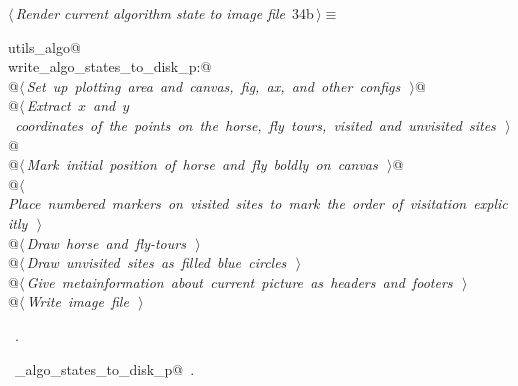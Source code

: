 \documentclass[11.5pt]{report}
\begin{document}
\begin{flushleft} \small\label{scrap38}\raggedright\small
{} $\langle\,${\itshape Render current algorithm state to image file}\nobreak\ {\footnotesize {34b}}$\,\rangle\equiv$
\vspace{-1ex}
\begin{list}{}{} \item
\mbox{}\verb@import utils_algo@\\
\mbox{}\verb@if write_algo_states_to_disk_p:@\\
\mbox{}\verb@     @\hbox{$\langle\,${\itshape Set up plotting area and canvas, fig, ax, and other configs}\nobreak\ {\footnotesize {}}$\,\rangle$}\verb@  @\\
\mbox{}\verb@     @\hbox{$\langle\,${\itshape Extract $x$ and $y$ coordinates of the points on the horse, fly tours, visited and unvisited sites}\nobreak\ {\footnotesize {}}$\,\rangle$}\verb@  @\\
\mbox{}\verb@     @\hbox{$\langle\,${\itshape Mark initial position of horse and fly boldly on canvas}\nobreak\ {\footnotesize {}}$\,\rangle$}\verb@  @\\
\mbox{}\verb@     @\hbox{$\langle\,${\itshape Place numbered markers on visited sites to mark the order of visitation explicitly}\nobreak\ {\footnotesize {}}$\,\rangle$}\verb@@\\
\mbox{}\verb@     @\hbox{$\langle\,${\itshape Draw horse and fly-tours}\nobreak\ {\footnotesize {}}$\,\rangle$}\verb@@\\
\mbox{}\verb@     @\hbox{$\langle\,${\itshape Draw unvisited sites as filled blue circles}\nobreak\ {\footnotesize {}}$\,\rangle$}\verb@@\\
\mbox{}\verb@     @\hbox{$\langle\,${\itshape Give metainformation about current picture as headers and footers}\nobreak\ {\footnotesize {}}$\,\rangle$}\verb@@\\
\mbox{}\verb@     @\hbox{$\langle\,${\itshape Write image file}\nobreak\ {\footnotesize {}}$\,\rangle$}\verb@@\\
\mbox{}\verb@@{\NWsep}
\end{list}
\vspace{-1.5ex}
\footnotesize
\begin{list}{}{\setlength{\itemsep}{-\parsep}\setlength{\itemindent}{-\leftmargin}}
\item \NWtxtMacroRefIn\ .
\item \NWtxtIdentsUsed\nobreak\  \verb@write_algo_states_to_disk_p@\nobreak\ .
\item{}
\end{list}
\vspace{4ex}
\end{flushleft}
\end{document}
